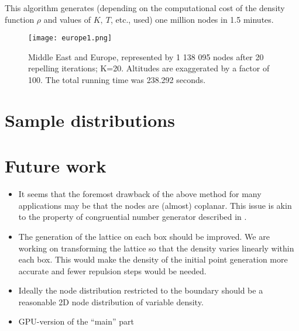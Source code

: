 \documentclass{amsart}
\theoremstyle{definition}
\begin{document}
This algorithm generates (depending on the computational cost of the density function $ \rho $ and values of $ K,\  T$, etc., used) one million nodes in 1.5 minutes.

\begin{figure}
	\centering
	\texttt{[image: europe1.png]}
	\caption{Middle East and Europe, represented by 1 138 095 nodes after 20 repelling iterations; K=20. Altitudes are exaggerated by a factor of 100. The total running time was 238.292 seconds.}
	\label{europe}
\end{figure}


\section{Sample distributions}


\section{Future work}
\begin{itemize}
	\item It seems that the foremost drawback of the above method for many applications may be that the nodes are (almost) coplanar. This issue is akin to the property of congruential number generator described in \cite{Marsaglia1968}.
	\item The generation of the lattice on each box should be improved. We are working on transforming the lattice so that the density varies linearly within each box. This would make the density of the initial point generation more accurate and fewer repulsion steps would be needed.
	\item Ideally the node distribution restricted to the boundary should be a reasonable 2D node distribution of variable density.
	\item GPU-version of the ``main'' part \cite{Recipes1989}
\end{itemize}



\end{document}
